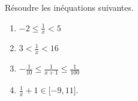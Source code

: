 
\begin{exercice}\label{exosmath-0350}

    Résoudre les inéquations suivantes.
    \begin{multicols}{2}
        \begin{enumerate}
            \item
                \( -2\leq \frac{1}{ x }<5\)
            \item
                \( 3<\frac{1}{ x }<16\)
            \item
                \( -\frac{1}{ 10 }\leq \frac{1}{ x+1 }\leq \frac{1}{ 100 }\)
            \item
                \( \frac{1}{ x }+1\in\mathopen[ -9 , 11 \mathclose]\).
        \end{enumerate}
    \end{multicols}

\end{exercice}
